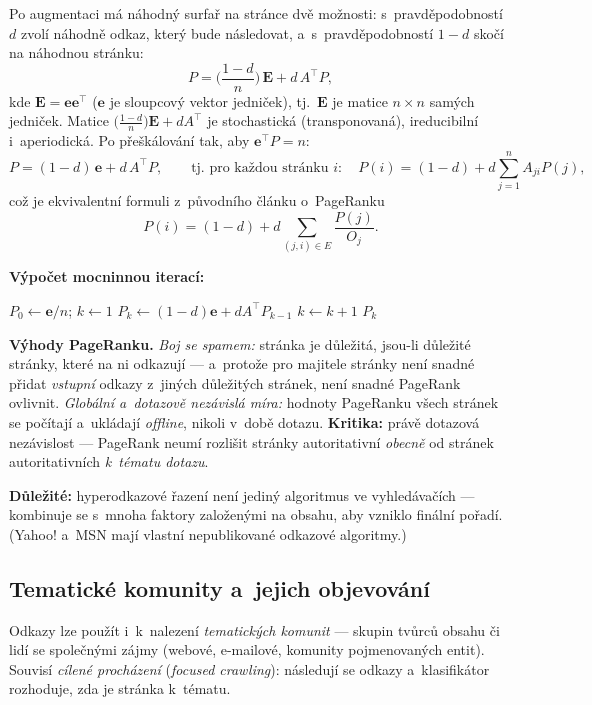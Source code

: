 \documentclass[11pt,a4paper]{article}
\theoremstyle{definition}
\begin{document}
\begin{defbox}
Po augmentaci má náhodný surfař na stránce dvě možnosti: s~pravděpodobností $d$ zvolí náhodně
odkaz, který bude následovat, a~s~pravděpodobností $1-d$ skočí na náhodnou stránku:
\[ P=\Big(\frac{1-d}{n}\Big)\,\mathbf{E}+d\,A^{\!\top}P, \]
kde $\mathbf E=\mathbf{ee}^{\!\top}$ ($\mathbf e$ je sloupcový vektor jedniček), tj.\
$\mathbf E$ je matice $n\times n$ samých jedniček. Matice
$\big(\frac{1-d}{n}\big)\mathbf E+dA^{\!\top}$ je stochastická (transponovaná), ireducibilní
i~aperiodická. Po přeškálování tak, aby $\mathbf e^{\!\top}P=n$:
\[ P=(1-d)\,\mathbf e+d\,A^{\!\top}P,\qquad\text{tj.\ pro každou stránku } i: \quad
   P(i)=(1-d)+d\sum_{j=1}^{n}A_{ji}P(j), \]
což je ekvivalentní formuli z~původního článku o~PageRanku
\[ P(i)=(1-d)+d\sum_{(j,i)\in E}\frac{P(j)}{O_j}. \]

\textbf{Výpočet mocninnou iterací:}
\begin{algorithmic}[1]
\State $P_0\gets \mathbf e/n$; $k\gets 1$
\Repeat
  \State $P_k\gets (1-d)\mathbf e+dA^{\!\top}P_{k-1}$
  \State $k\gets k+1$
\State \Return $P_k$
\end{algorithmic}
\end{defbox}

\textbf{Výhody PageRanku.} \emph{Boj se spamem:} stránka je důležitá, jsou-li důležité stránky,
které na ni odkazují --- a~protože pro majitele stránky není snadné přidat \emph{vstupní}
odkazy z~jiných důležitých stránek, není snadné PageRank ovlivnit. \emph{Globální
a~dotazově nezávislá míra:} hodnoty PageRanku všech stránek se počítají a~ukládají
\emph{offline}, nikoli v~době dotazu. \textbf{Kritika:} právě dotazová nezávislost --- PageRank
neumí rozlišit stránky autoritativní \emph{obecně} od stránek autoritativních \emph{k~tématu
dotazu}.

\textbf{Důležité:} hyperodkazové řazení není jediný algoritmus ve vyhledávačích --- kombinuje se
s~mnoha faktory založenými na obsahu, aby vzniklo finální pořadí. (Yahoo! a~MSN mají vlastní
nepublikované odkazové algoritmy.)

\subsection{Tematické komunity a~jejich objevování}

Odkazy lze použít i~k~nalezení \emph{tematických komunit} --- skupin tvůrců obsahu či lidí se
společnými zájmy (webové, e-mailové, komunity pojmenovaných entit). Souvisí \emph{cílené
procházení} (\emph{focused crawling}): následují se odkazy a~klasifikátor rozhoduje, zda je
stránka k~tématu.
\end{document}
